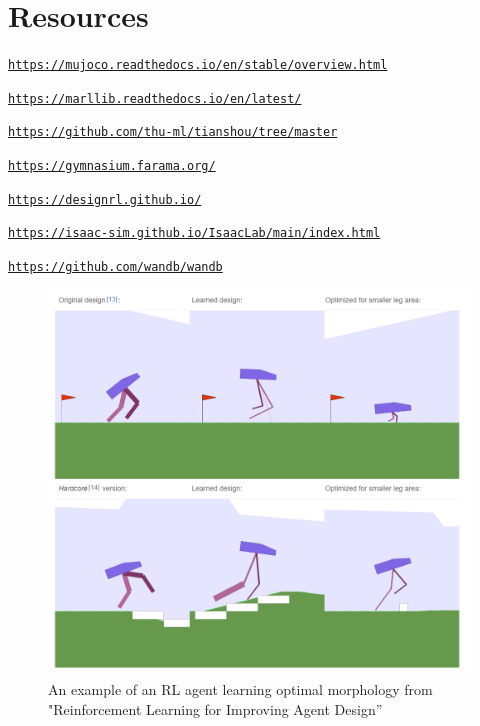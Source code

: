 \documentclass{article}
\begin{document}
\section*{Resources}

\href{https://mujoco.readthedocs.io/en/stable/overview.html}{\texttt{https://mujoco.readthedocs.io/en/stable/overview.html}}

\noindent
\href{https://marllib.readthedocs.io/en/latest/}{\texttt{https://marllib.readthedocs.io/en/latest/}}

\noindent
\href{https://github.com/thu-ml/tianshou/tree/master}{\texttt{https://github.com/thu-ml/tianshou/tree/master}}

\noindent
\href{https://gymnasium.farama.org/}{\texttt{https://gymnasium.farama.org/}}

\noindent
\href{https://designrl.github.io/}{\texttt{https://designrl.github.io/}}

\noindent
\href{https://isaac-sim.github.io/IsaacLab/main/index.html}{\texttt{https://isaac-sim.github.io/IsaacLab/main/index.html}}

\noindent
\href{https://github.com/wandb/wandb}{\texttt{https://github.com/wandb/wandb}}


\vspace{0.25in}
\begin{figure}[htbp]
  \centering
  \includegraphics[width=0.4\linewidth]{figures/biped.png}  %
  \caption{An example of an RL agent learning optimal morphology from "Reinforcement Learning for Improving Agent Design”}
  \label{fig:rl-agent}
\end{figure}
\end{document}
